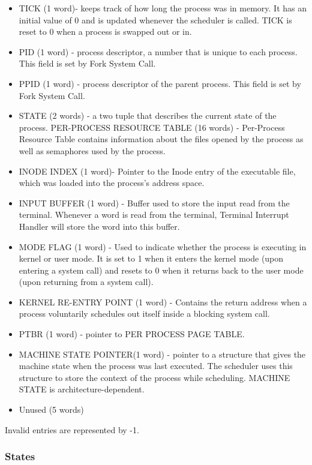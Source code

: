 \begin {itemize}

\item TICK (1 word)- keeps track of how long the process was in memory. It has an initial value of 0 and is updated whenever the scheduler is called. TICK is reset to 0 when a process is swapped out or in.
\item PID (1 word) - process descriptor, a number that is unique to each process. This field is set by Fork System Call.
\item PPID (1 word) - process descriptor of the parent process. This field is set by Fork System Call.
\item STATE (2 words) - a two tuple that describes the current state of the process.
PER-PROCESS RESOURCE TABLE (16 words) - Per-Process Resource Table contains information about the files opened by the process as well as semaphores used by the process.
\item INODE INDEX (1 word)- Pointer to the Inode entry of the executable file, which was loaded into the process's address space.
\item INPUT BUFFER (1 word) - Buffer used to store the input read from the terminal. Whenever a word is read from the terminal, Terminal Interrupt Handler will store the word into this buffer.
\item MODE FLAG (1 word) - Used to indicate whether the process is executing in kernel or user mode. It is set to 1 when it enters the kernel mode (upon entering a system call) and resets to 0 when it returns back to the user mode (upon returning from a system call).
\item KERNEL RE-ENTRY POINT (1 word) - Contains the return address when a process voluntarily schedules out itself inside a blocking system call.
\item PTBR (1 word) - pointer to PER PROCESS PAGE TABLE.
\item MACHINE STATE POINTER(1 word) - pointer to a structure that gives the machine state when the process was last executed. The scheduler uses this structure to store the context of the process while scheduling. MACHINE STATE is architecture-dependent.
\item Unused (5 words)

\end {itemize}
Invalid entries are represented by -1.

\subsubsection {States}

